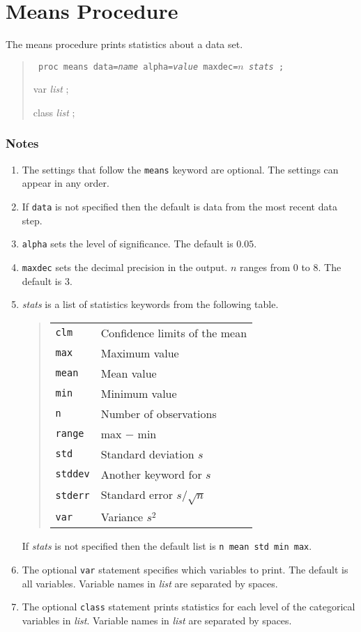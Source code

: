 \documentclass[12pt]{article}
\begin{document}
\newpage

\section{Means Procedure}

The means procedure prints statistics about a data set.

\begin{quote}
{\tt
proc means data={\it name} alpha={\it value} maxdec=$n$ {\it stats} ;

var {\it list} ;

class {\it list} ;
}
\end{quote}

\subsubsection*{Notes}

\begin{enumerate}
\item
The settings that follow the {\tt means} keyword are optional.
The settings can appear in any order.
\item
If {\tt data} is not specified then the default is data from
the most recent data step.
\item
{\tt alpha} sets the level of significance.
The default is $0.05$.
\item
{\tt maxdec} sets the decimal precision in the output.
$n$ ranges from 0 to 8.
The default is 3.
\item
{\it stats} is a list of statistics keywords
from the following table.
\begin{quote}
\begin{tabular}{ll}
{\tt clm} & Confidence limits of the mean\\
{\tt max} & Maximum value\\
{\tt mean} & Mean value\\
{\tt min} & Minimum value\\
{\tt n} & Number of observations\\
{\tt range} & max $-$ min\\
{\tt std} & Standard deviation $s$\\
{\tt stddev} & Another keyword for $s$\\
{\tt stderr} & Standard error $s/\sqrt n$\\
{\tt var} & Variance $s^2$
\end{tabular}
\end{quote}
If {\it stats} is not specified then the default list is
{\tt n mean std min max}.
\item
The optional {\tt var} statement specifies which variables to print.
The default is all variables.
Variable names in {\it list} are separated by spaces.
\item
The optional {\tt class} statement prints statistics for each level
of the categorical variables in {\it list}.
Variable names in {\it list} are separated by spaces.
\end{enumerate}
\end{document}
